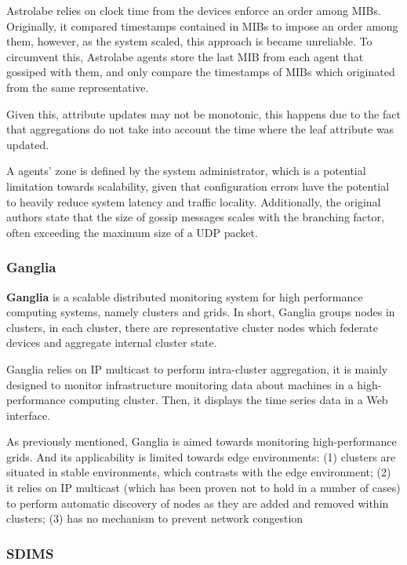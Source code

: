 Astrolabe relies on clock time from the devices enforce an order among MIBs. Originally, it compared timestamps contained in MIBs to impose an order among them, however, as the system scaled, this approach is became unreliable. To circumvent this, Astrolabe agents store the last MIB from each agent that gossiped with them, and only compare the timestamps of MIBs which originated from the same representative.

Given this, attribute updates may not be monotonic, this happens due to the fact that aggregations do not take into account the time where the leaf attribute was updated. 

A agents' zone is defined by the system administrator, which is a potential limitation towards scalability, given that configuration errors have the potential to heavily reduce system latency and traffic locality. Additionally, the original authors state that the size of gossip messages scales with the branching factor, often exceeding the maximum size of a UDP packet. 

\subsubsection{Ganglia}

\textbf{Ganglia} is a scalable distributed monitoring system \cite{massie2004ganglia} for high performance computing systems, namely clusters and grids. In short, Ganglia groups nodes in clusters, in each cluster, there are representative cluster nodes which federate devices and aggregate internal cluster state.

Ganglia relies on IP multicast to perform intra-cluster aggregation, it is mainly designed to monitor infrastructure monitoring data about machines in a high-performance computing cluster. Then, it displays the time series data in a Web interface.

As previously mentioned, Ganglia is aimed towards monitoring high-performance 
grids. And its applicability is limited towards edge environments: (1) clusters are situated in stable environments, which contrasts with the edge environment; (2) it relies on IP multicast (which has been proven not to hold in a number of cases) to perform automatic discovery of nodes as they are added and removed within clusters; (3) has no mechanism to prevent network congestion 

\subsubsection{SDIMS}

